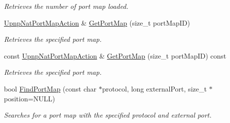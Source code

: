 \begin{DoxyCompactItemize}
\begin{DoxyCompactList}\small\item\em Retrieves the number of port map loaded. \item\end{DoxyCompactList}\item 
\hyperlink{class_upnp_nat_port_map_action}{UpnpNatPortMapAction} \& \hyperlink{class_upnp_nat_action_a5a16c48c2b2e857f2a86e1d939dca7c3}{GetPortMap} (size\_\-t portMapID)
\begin{DoxyCompactList}\small\item\em Retrieves the specified port map. \item\end{DoxyCompactList}\item 
const \hyperlink{class_upnp_nat_port_map_action}{UpnpNatPortMapAction} \& \hyperlink{class_upnp_nat_action_a01c7da7ca77120a04bf9fef51d9b0706}{GetPortMap} (size\_\-t portMapID) const 
\begin{DoxyCompactList}\small\item\em Retrieves the specified port map. \item\end{DoxyCompactList}\item 
bool \hyperlink{class_upnp_nat_action_a99fa35fc9406550aaa66f2f301619a57}{FindPortMap} (const char $\ast$protocol, long externalPort, size\_\-t $\ast$position=NULL)
\begin{DoxyCompactList}\small\item\em Searches for a port map with the specified protocol and external port. \item\end{DoxyCompactList}\end{DoxyCompactItemize}
